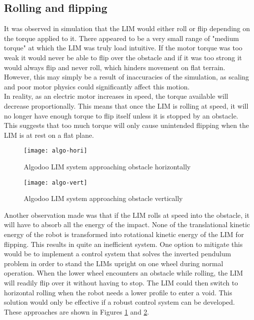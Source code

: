 \subsection{Rolling and flipping}

It was observed in simulation that the LIM would either roll or flip depending on the torque applied to it. There appeared to be a very small range of "medium torque" at which the LIM was truly load intuitive. If the motor torque was too weak it would never be able to flip over the obstacle and if it was too strong it would always flip and never roll, which hinders movement on flat terrain. However, this may simply be a result of inaccuracies of the simulation, as scaling and poor motor physics could significantly affect this motion. \\

In reality, as an electric motor increases in speed, the torque available will decrease proportionally. This means that once the LIM is rolling at speed, it will no longer have enough torque to flip itself unless it is stopped by an obstacle. This suggests that too much torque will only cause unintended flipping when the LIM is at rest on a flat plane.\\

\begin{figure}[h]
	\centering
	\texttt{[image: algo-hori]}
	\caption{Algodoo LIM system approaching obstacle horizontally}
	\label{algo-hori}
\end{figure}

\begin{figure}[h]
	\centering
	\texttt{[image: algo-vert]}
	\caption{Algodoo LIM system approaching obstacle vertically}
	\label{algo-vert}
\end{figure}

Another observation made was that if the LIM rolls at speed into the obstacle, it will have to absorb all the energy of the impact. None of the translational kinetic energy of the robot is transformed into rotational kinetic energy of the LIM for flipping. This results in quite an inefficient system. One option to mitigate this would be to implement a control system that solves the inverted pendulum problem in order to stand the LIMs upright on one wheel during normal operation. When the lower wheel encounters an obstacle while rolling, the LIM will readily flip over it without having to stop. The LIM could then switch to horizontal rolling when the robot needs a lower profile to enter a void. This solution would only be effective if a robust control system can be developed. These approaches are shown in Figures \ref{algo-hori} and \ref{algo-vert}.